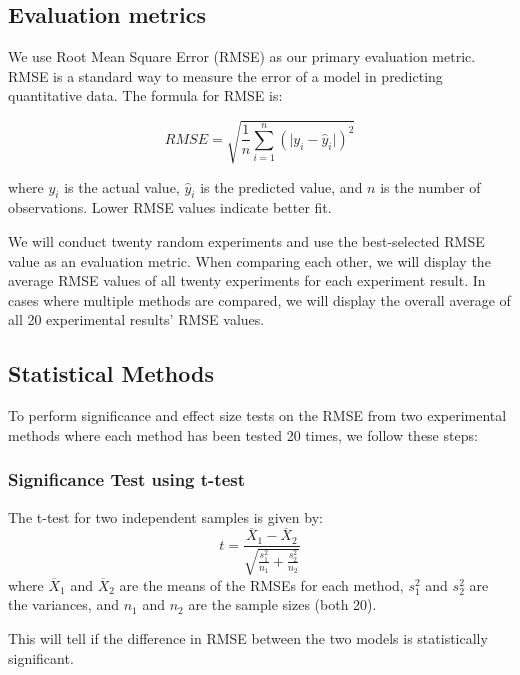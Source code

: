 \documentclass{ieeeaccess}
\begin{document}
\subsection{Evaluation metrics}
We use Root Mean Square Error (RMSE) as our primary evaluation metric. RMSE is a standard way to measure the error of a model in predicting quantitative data. The formula for RMSE is:

\begin{equation}
    RMSE = \sqrt{\frac{1}{n}\sum_{i=1}^{n}(\lvert y_i - \hat{y}_i \rvert )^2}
\end{equation}

where $y_i$ is the actual value, $\hat{y}_i$ is the predicted value, and $n$ is the number of observations. Lower RMSE values indicate better fit.

We will conduct twenty random experiments and use the best-selected RMSE value as an evaluation metric. When comparing each other, we will display the average RMSE values of all twenty experiments for each experiment result. In cases where multiple methods are compared, we will display the overall average of all 20 experimental results' RMSE values.

\subsection{Statistical Methods}
To perform significance and effect size tests on the RMSE from two experimental methods where each method has been tested 20 times, we follow these steps:

\subsubsection*{Significance Test using t-test}
The t-test for two independent samples is given by:
\begin{equation}
    t = \frac{\overline{X}_1 - \overline{X}_2}{\sqrt{\frac{s_1^2}{n_1} + \frac{s_2^2}{n_2}}}
\end{equation}
where $\overline{X}_1$ and $\overline{X}_2$ are the means of the RMSEs for each method, $s_1^2$ and $s_2^2$ are the variances, and $n_1$ and $n_2$ are the sample sizes (both 20).

This will tell if the difference in RMSE between the two models is statistically significant.
\end{document}
